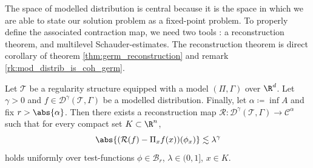 The space of modelled distribution is central because it is the space in which we are able to state our solution problem as a fixed-point problem.
To properly define the associated contraction map, we need two tools : a reconstruction theorem, and multilevel Schauder-estimates.
The reconstruction theorem is direct corollary of theorem \ref{thm:germ_reconstruction} and remark \ref{rk:mod_distrib_is_coh_germ}.
\begin{corollary}
Let $\mathcal{T}$ be a regularity structure equipped with a model $(\Pi,\Gamma)$ over $\R^d$.
Let $\gamma>0$ and $f\in \mathcal{D}^\gamma(\mathcal{T},\Gamma)$ be a modelled distribution.
Finally, let $\alpha \coloneq \inf A$ and fix $r>\abs{\alpha}$.
Then there exists a reconstruction map $\mathcal{R}:\mathcal{D}^\gamma(\mathcal{T},\Gamma) \rightarrow \mathcal{C}^\alpha$ such that 
for every compact set $K\subset \R^n$, 
\begin{equation*}
    \abs{(\mathcal{R}(f) - \Pi_x f(x))(\phi_x)} \lesssim \lambda^\gamma 
\end{equation*}
holds uniformly over test-functions $\phi \in \mathcal{B}_r$, $\lambda \in (0,1]$, $x \in K$.
\end{corollary}